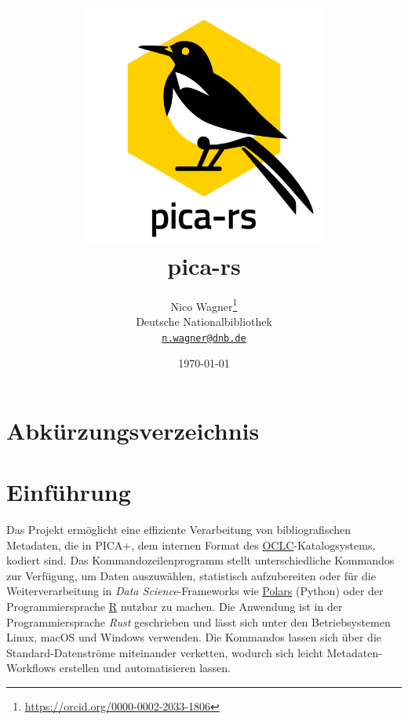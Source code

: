 \documentclass[a4paper,12pt,oneside]{scrreport}
\begin{document}
\title{\includegraphics[width=0.6\textwidth]{logo}\\
  \textbf{\textsf{\Huge pica-rs}}}
\author{\Large Nico Wagner\footnote{
    \url{https://orcid.org/0000-0002-2033-1806}}\\
  Deutsche Nationalbibliothek\\
  \href{mailto:n.wagner@dnb.de}{\texttt{n.wagner@dnb.de}}}
\date{\vfill \today}

\maketitle

\tableofcontents
\clearpage

\chapter*{Abkürzungsverzeichnis}


\chapter{Einführung}
\label{ch:einf}

Das Projekt  ermöglicht eine effiziente Verarbeitung von
bibliografischen Metadaten, die in PICA+, dem internen Format des
\href{https://www.oclc.org/}{OCLC}-Katalogsystems, kodiert sind. Das
Kommandozeilenprogramm  stellt unterschiedliche Kommandos
zur Verfügung, um Daten auszuwählen, statistisch aufzubereiten oder
für die Weiterverarbeitung in \emph{Data Science}-Frameworks wie
\href{https://pola.rs/}{Polars} (Python) oder der Programmiersprache
\href{https://www.r-project.org/}{R} nutzbar zu machen. Die Anwendung
ist in der Programmiersprache \textit{Rust} geschrieben und lässt sich
unter den Betriebsystemen Linux, macOS und Windows verwenden. Die
Kommandos lassen sich über die Standard-Datenströme miteinander
verketten, wodurch sich leicht Metadaten-Workflows erstellen und
automatisieren lassen.
\end{document}
